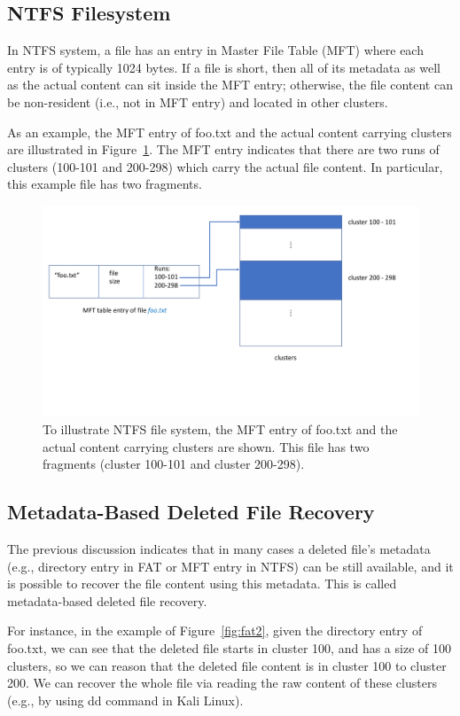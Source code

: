 \subsection{NTFS Filesystem}
In NTFS system, a file has an entry in Master File Table (MFT) where each entry is of typically 1024 bytes. 
If a file is short, then all of its metadata as well as the actual content can sit inside the MFT entry; otherwise, 
the file content can be non-resident (i.e., not in MFT entry) and located in other clusters.
  
As an example, the MFT entry of foo.txt and the actual content carrying clusters are illustrated in Figure~\ref{fig:ntfs}.
The MFT entry indicates that there are two runs of clusters (100-101 and 200-298) which carry the actual file content. 
In particular, this example file has two fragments.

\begin{figure}[h]
    \centering
    \includegraphics[width=\linewidth]{fig/ntfs.pdf}
    \caption{To illustrate NTFS file system, the MFT entry of foo.txt and the actual content carrying clusters are shown. 
This file has two fragments (cluster 100-101 and cluster 200-298).}
    \label{fig:ntfs}
\end{figure}
\subsection{Metadata-Based Deleted File Recovery}
The previous discussion indicates that in many cases a deleted file's metadata 
(e.g., directory entry in FAT or MFT entry in NTFS) can be still available, 
and it is possible to recover the file content using this metadata. 
This is called metadata-based deleted file recovery.

For instance, in the example of Figure~\ref{fig:fat2}, given the directory entry of foo.txt, 
we can see that the deleted file starts in cluster 100, and has a size of 100 clusters,
so we can reason that the deleted file content is in cluster 100 to cluster 200.
We can recover the whole file via reading the raw content of these clusters (e.g., by using dd command in Kali Linux). 

